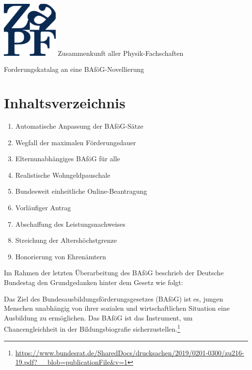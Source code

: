 \documentclass[DIV=calc]{scrartcl}
\begin{document}
    \hspace{0.87\textwidth}
    \begin{minipage}{120pt}
        \vspace{-1.8cm}
      \includegraphics[width=80pt]{../logo.pdf}
        \centering
        \small Zusammenkunft aller Physik-Fachschaften
    \end{minipage}
    \begin{center}
        \Huge{Forderungskatalag an eine BAföG-Novellierung}\vspace{.25\baselineskip}\\
        \normalsize
    \end{center}
    \vspace{1cm}

\section*{Inhaltsverzeichnis}
\begin{enumerate}
    \item Automatische Anpassung der BAföG-Sätze
    \item Wegfall der maximalen Förderungsdauer
    \item Elternunabhängiges BAföG für alle
    \item Realistische Wohngeldpauschale
    \item Bundesweit einheitliche Online-Beantragung
    \item Vorläufiger Antrag
    \item Abschaffung des Leistungsnachweises
    \item Streichung der Altershöchstgrenze
    \item Honorierung von Ehrenämtern
\end{enumerate}

\newpage

Im Rahmen der letzten Überarbeitung des BAföG beschrieb der Deutsche Bundestag den Grundgedanken hinter dem Gesetz wie folgt:

\glqq Das Ziel des Bundesausbildungsförderungsgesetzes (BAföG) ist es, jungen Menschen unabhängig von ihrer sozialen und wirtschaftlichen Situation eine Ausbildung zu ermöglichen. Das BAföG ist das Instrument, um Chancengleichheit in der Bildungsbiografie sicherzustellen.\grqq{}\footnote{\url{https://www.bundesrat.de/SharedDocs/drucksachen/2019/0201-0300/zu216-19.pdf?__blob=publicationFile&v=1}}
\end{document}
